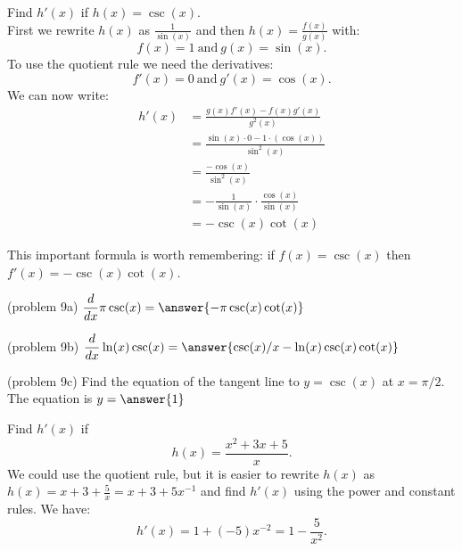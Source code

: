 \documentclass[handout]{ximera}
\begin{document}
\begin{example}[example 9]
Find $h'(x)$ if $h(x) = \csc(x).$\\
First we rewrite $h(x)$ as $\displaystyle{\frac{1}{\sin(x)}}$ 
and then $\displaystyle{h(x) = \frac{f(x)}{g(x)}}$ with:
\[f(x) = 1 \  \mbox{and} \  g(x)= \sin(x).\]
To use the quotient rule we need the derivatives:
\[f'(x) = 0 \  \mbox{and} \   g'(x) = \cos(x).\]
We can now write: 
\begin{align*}
h'(x) &= \frac{g(x)f'(x) - f(x)g'(x)}{g^2(x)}\\
&= \frac{\sin(x)\cdot 0 - 1\cdot (\cos(x))}{\sin^2(x)}\\
&= \frac{ -\cos(x)}{\sin^2(x)} \\
&= -\frac{ 1}{\sin(x)} \cdot \frac{\cos(x)}{\sin(x)}\\
&=  -\csc(x) \cot(x)
\end{align*}

This important formula is worth remembering: if $f(x) = \csc(x)$ then $f'(x) =-\csc(x) \cot(x)$.
\end{example}



\begin{problem}(problem 9a)
  $\displaystyle{\frac{d}{dx} \pi\csc(x)= \answer{-\pi\csc(x)\cot(x)}}$\\
\end{problem}

\begin{problem}(problem 9b)
  $\displaystyle{\frac{d}{dx} \ln(x) \csc(x)= \answer{\csc(x)/x - \ln(x)\csc(x)\cot(x)}}$\\
\end{problem}

\begin{problem}(problem 9c)
  Find the equation of the tangent line to $y = \csc(x)$ at $x = \pi/2$.\\
  The equation is $y = \answer{1}$
\end{problem}






\begin{example}[example 10]
Find $h'(x)$ if 
\[
h(x) = \frac{x^2 + 3x + 5}{x}.
\]
We could use the quotient rule, 
but it is easier to rewrite $h(x)$ as $h(x) = x + 3 + \frac{5}{x} = x + 3 + 5x^{-1}$ and 
find $h'(x)$ using the power and constant rules.  We have:
\[h'(x) = 1 + (-5)x^{-2} = 1 - \frac{5}{x^2}.\] 
\end{example}
\end{document}
